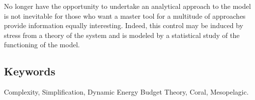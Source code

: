 No longer have the opportunity to undertake an analytical approach to the model is not inevitable for those who want a master tool for a multitude of approaches provide information equally interesting. Indeed, this control may be induced by stress from a theory of the system and is modeled by a statistical study of the functioning of the model.



  \subsection*{Keywords} Complexity, Simplification, Dynamic Energy Budget Theory, Coral, Mesopelagic.

\thispagestyle{empty}
